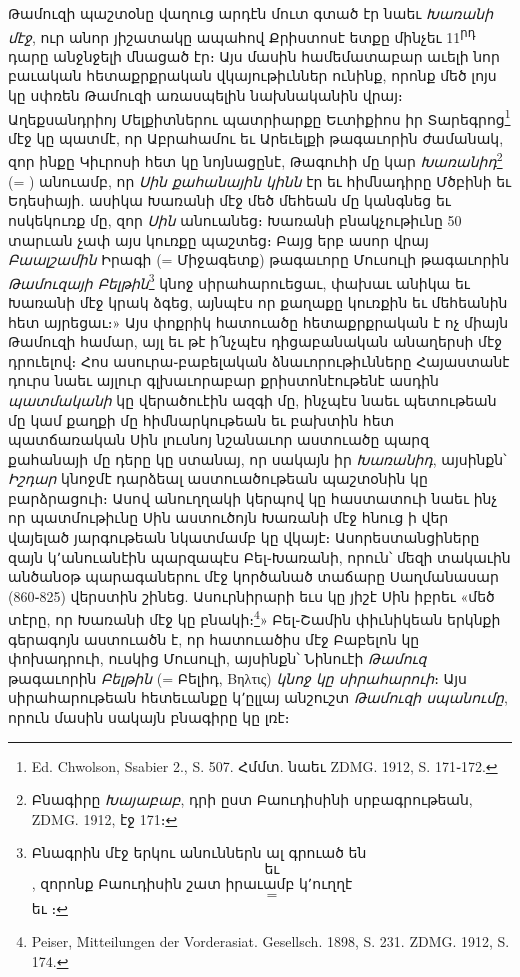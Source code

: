 \documentclass{article}
\newcommand*\svgAAAC{}
\newcommand*\svgAAAD{}
\newcommand*\svgAAAE{}
\newcommand*\svgAAAF{}
\newcommand*\svgAAAG{}
\newcommand*\svgAAAH{}
\begin{document}
{Թամուզի պաշտօնը վաղուց արդէն մուտ գտած էր նաեւ \emph{Խառանի մէջ}, ուր անոր յիշատակը ապահով Քրիստոսէ ետքը մինչեւ 11\textsuperscript{րդ} դարը անջնջելի մնացած էր։ Այս մասին համեմատաբար աւելի նոր բաւական հետաքրքրական վկայութիւններ ունինք, որոնք մեծ լոյս կը սփռեն Թամուզի առասպելին նախնականին վրայ։ Աղեքսանդրիոյ Մելքիտներու պատրիարքը Եւտիքիոս իր Տարեգրոց\footnote{Ed. Chwolson, Ssabier 2., S. 507. Հմմտ. նաեւ ZDMG. 1912, S. 171֊172.} մէջ կը պատմէ, որ Աբրահամու եւ Արեւելքի թագաւորին ժամանակ, զոր ինքը Կիւրոսի հետ կը նոյնացընէ, Թագուհի մը կար \emph{Խառանիդ}\footnote{Բնագիրը \emph{Խայաբաբ}, դրի ըստ Բաուդիսինի սրբագրութեան, ZDMG. 1912, էջ 171։} (= $\svgAAAC$) անուամբ, որ \emph{Սին քահանային կինն} էր եւ հիմնադիրը Մծբինի եւ Եդեսիայի. ասիկա Խառանի մէջ մեծ մեհեան մը կանգնեց եւ ոսկեկուռք մը, զոր \emph{Սին} անուանեց։ Խառանի բնակչութիւնը 50 տարւան չափ այս կուռքը պաշտեց։ Բայց երբ ասոր վրայ \emph{Բաալշամին} Իրագի (= Միջագետք) թագաւորը Մուսուլի թագաւորին \emph{Թամուզայի Բելթին}\footnote{Բնագրին մէջ երկու անուններն ալ գրուած են $\svgAAAD$ եւ $\svgAAAE$, զորոնք Բաուդիսին շատ իրաւամբ կ՚ուղղէ $\svgAAAF$ = $\svgAAAG$ եւ $\svgAAAH$։} կնոջ սիրահարուեցաւ, փախաւ անիկա եւ Խառանի մէջ կրակ ձգեց, այնպէս որ քաղաքը կուռքին եւ մեհեանին հետ այրեցաւ։» Այս փոքրիկ հատուածը հետաքրքրական է ոչ միայն Թամուզի համար, այլ եւ թէ ի՛նչպէս դիցաբանական անաղերսի մէջ դրուելով։ Հոս ասուրա֊բաբելական ձնաւորութիւնները Հայաստանէ դուրս նաեւ այլուր գլխաւորաբար քրիստոնէութենէ ասդին \emph{պատմականի} կը վերածուէին ազգի մը, ինչպէս նաեւ պետութեան մը կամ քաղքի մը հիմնարկութեան եւ բախտին հետ պատճառական Սին լուսնոյ նշանաւոր աստուածը պարզ քահանայի մը դերը կը ստանայ, որ սակայն իր \emph{Խառանիդ}, այսինքն՝ \emph{Իշդար} կնոջմէ դարձեալ աստուածութեան պաշտօնին կը բարձրացուի։ Ասով անուղղակի կերպով կը հաստատուի նաեւ ինչ որ պատմութիւնը Սին աստուծոյն Խառանի մէջ հնուց ի վեր վայելած յարգութեան նկատմամբ կը վկայէ։ Ասորեստանցիները զայն կ՚անուանէին պարզապէս Բել֊Խառանի, որուն՝ մեզի տակաւին անծանօթ պարագաներու մէջ կործանած տաճարը Սաղմանասար (860֊825) վերստին շինեց. Ասուրնիրարի եւս կը յիշէ Սին իբրեւ «մեծ տէրը, որ Խառանի մէջ կը բնակի։\footnote{Peiser, Mitteilungen der Vorderasiat. Gesellsch. 1898, S. 231. ZDMG. 1912, S. 174.}» Բել֊Շամին փիւնիկեան երկնքի գերագոյն աստուածն է, որ հատուածիս մէջ Բաբելոն կը փոխադրուի, ուսկից Մուսուլի, այսինքն՝ Նինուէի \emph{Թամուզ} թագաւորին \emph{Բելթին} (= Բելիդ, Βηλτις) \emph{կնոջ կը սիրահարուի}։ Այս սիրահարութեան հետեւանքը կ՚ըլլայ անշուշտ \emph{Թամուզի սպանումը}, որուն մասին սակայն բնագիրը կը լռէ։

}
\end{document}
